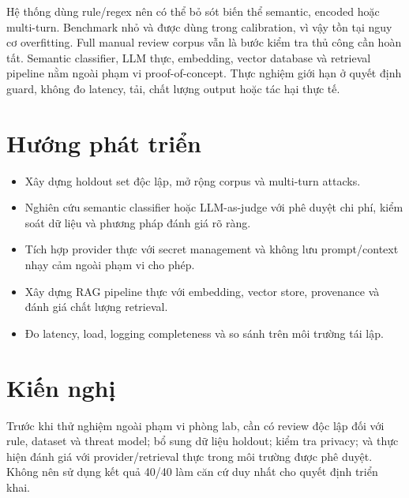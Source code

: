 Hệ thống dùng rule/regex nên có thể bỏ sót biến thể semantic, encoded hoặc
multi-turn. Benchmark nhỏ và được dùng trong calibration, vì vậy tồn tại nguy
cơ overfitting. Full manual review corpus vẫn là bước kiểm tra thủ công cần hoàn
tất. Semantic classifier, LLM thực, embedding, vector database và retrieval
pipeline nằm ngoài phạm vi proof-of-concept. Thực nghiệm giới hạn ở quyết định
guard, không đo latency, tải, chất lượng output hoặc tác hại thực tế.

\section*{Hướng phát triển}

\begin{itemize}
    \item Xây dựng holdout set độc lập, mở rộng corpus và multi-turn attacks.
    \item Nghiên cứu semantic classifier hoặc LLM-as-judge với phê duyệt chi phí,
    kiểm soát dữ liệu và phương pháp đánh giá rõ ràng.
    \item Tích hợp provider thực với secret management và không lưu prompt/context
    nhạy cảm ngoài phạm vi cho phép.
    \item Xây dựng RAG pipeline thực với embedding, vector store, provenance và
    đánh giá chất lượng retrieval.
    \item Đo latency, load, logging completeness và so sánh trên môi trường tái lập.
\end{itemize}

\section*{Kiến nghị}

Trước khi thử nghiệm ngoài phạm vi phòng lab, cần có review độc lập đối với rule,
dataset và threat model; bổ sung dữ liệu holdout; kiểm tra privacy; và thực hiện
đánh giá với provider/retrieval thực trong môi trường được phê duyệt. Không nên
sử dụng kết quả 40/40 làm căn cứ duy nhất cho quyết định triển khai.
